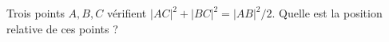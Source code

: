 Trois points $A, B, C$ vérifient $|AC|^2 + |BC|^2 = |AB|^2/2$. Quelle est la position relative de ces points ?

